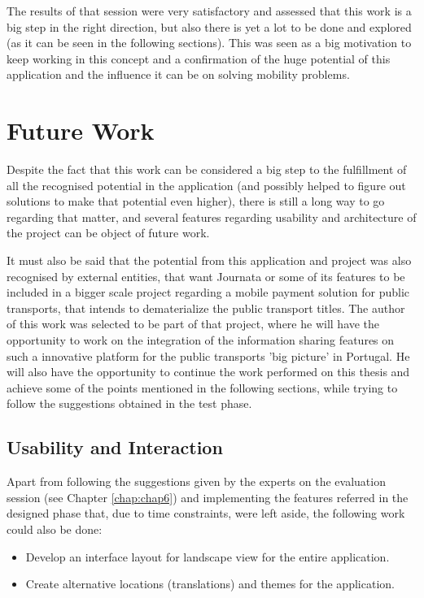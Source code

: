 The results of that session were very satisfactory and assessed that this work is a big step in the right direction, but also there is yet a lot to be done and explored (as it can be seen in the following sections). This was seen as a big motivation to keep working in this concept and a confirmation of the huge potential of this application and the influence it can be on solving mobility problems.

\section{Future Work}

Despite the fact that this work can be considered a big step to the fulfillment of all the recognised potential in the application (and possibly helped to figure out solutions to make that potential even higher), there is still a long way to go regarding that matter, and several features regarding usability and architecture of the project can be object of future work.


It must also be said that the potential from this application and project was also recognised by external entities, that want Journata or some of its features to be included in a bigger scale project regarding a mobile payment solution for public transports, that intends to dematerialize the public transport titles. 
The author of this work was selected to be part of that project, where he will have the opportunity to work on the integration of the information sharing features on such a innovative platform for the public transports 'big picture' in Portugal.
He will also have the opportunity to continue the work performed on this thesis and achieve some of the points mentioned in the following sections, while trying to follow the suggestions obtained in the test phase.

\subsection{Usability and Interaction}

Apart from following the suggestions given by the experts on the evaluation session (see Chapter \ref{chap:chap6}) and implementing the features referred in the designed phase that, due to time constraints, were left aside, the following work could also be done:

\begin{itemize}
\item Develop an interface layout for landscape view for the entire application.

\item Create alternative locations (translations) and themes for the application. 

\end{itemize}

